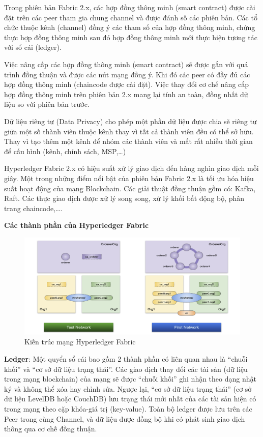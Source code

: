 Trong phiên bản Fabric 2.x, các hợp đồng thông minh (smart contract) được cài đặt trên các peer tham gia chung channel và được đánh số các phiên bản. Các tổ chức thuộc kênh (channel) đồng ý các tham số của hợp đồng thông minh, chứng thực hợp đồng thông minh sau đó hợp đồng thông minh mới thực hiện tương tác với sổ cái (ledger).

Việc nâng cấp các hợp đồng thông minh (smart contract) sẽ được gắn với quá trình đồng thuận và được các nút mạng đồng ý. Khi đó các peer có đầy đủ các hợp đồng thông minh (chaincode được cài đặt). Việc thay đổi cơ chế nâng cấp hợp đồng thông minh trên phiên bản 2.x mang lại tính an toàn, đồng nhất dữ liệu so với phiên bản trước.

Dữ liệu riêng tư (Data Privacy) cho phép một phần dữ liệu được chia sẽ riêng tư giữa một số thành viên thuộc kênh thay vì tất cả thành viên đều có thể sở hữu. Thay vì tạo thêm một kênh để nhóm các thành viên và mất rất nhiều thời gian để cấu hình (kênh, chính sách, MSP,…) 

Hyperledger Fabric 2.x có hiệu suất xử lý giao dịch đến hàng nghìn giao dịch mỗi giây. Một trong những điểm nổi bật của phiên bản Fabric 2.x là tối ưu hóa hiệu suất hoạt động của mạng Blockchain. Các giải thuật đồng thuận gồm có: Kafka, Raft. Các thực giao dịch được xử lý song song, xử lý khối bất động bộ, phân trang chaincode,\ldots.

\textbf{Các thành phần của Hyperledger Fabric}

\begin{figure}[htbp]
\centering
\includegraphics[width=.9\linewidth]{img/hlf_network.png}
\caption{Kiến trúc mạng Hyperledger Fabric}
\label{fig:hlf_network}
\end{figure}

\textbf{Ledger}: Một quyển sổ cái bao gồm 2 thành phần có liên quan nhau là “chuỗi khối” và “cơ sở dữ liệu trạng thái”. Các giao dịch thay đổi các tài sản (dữ liệu trong mạng blockchain) của mạng sẽ được “chuỗi khối” ghi nhận theo dạng nhật ký và không thể xóa hay chỉnh sửa. Ngược lại, “cơ sở dữ liệu trạng thái” (cơ sở dữ liệu LevelDB hoặc CouchDB) lưu trạng thái mới nhất của các tài sản hiện có trong mạng theo cặp khóa-giá trị (key-value). Toàn bộ ledger được lưu trên các Peer trong cùng Channel, và dữ liệu được đồng bộ khi có phát sinh giao dịch thông qua cơ chế đồng thuận.

